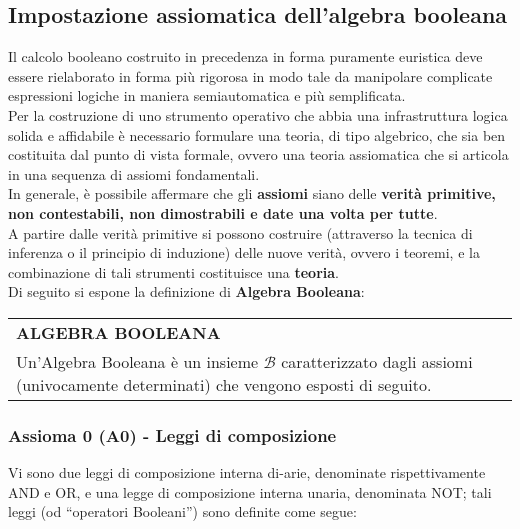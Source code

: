 \documentclass[a4paper]{extarticle}
\newcommand{\quotes}[1]{``#1''}
\renewcommand\arraystretch{}
\begin{document}
\subsection{Impostazione assiomatica dell'algebra booleana}
Il calcolo booleano costruito in precedenza in forma puramente euristica deve essere rielaborato in forma più rigorosa in modo tale da manipolare complicate espressioni logiche in maniera semiautomatica e più semplificata.\\
Per la costruzione di uno strumento operativo che abbia una infrastruttura logica solida e affidabile è necessario formulare una teoria, di tipo algebrico, che sia ben costituita dal punto di vista formale, ovvero una teoria assiomatica che si articola in una sequenza di assiomi fondamentali.\\
In generale, è possibile affermare che gli \textbf{assiomi} siano delle \textbf{verità primitive, non contestabili, non dimostrabili e date una volta per tutte}.\\
A partire dalle verità primitive si possono costruire (attraverso la tecnica di inferenza o il principio di induzione) delle nuove verità, ovvero i teoremi, e la combinazione di tali strumenti costituisce una \textbf{teoria}.\\
Di seguito si espone la definizione di \textbf{Algebra Booleana}:

\vspace{1em}
\setlength{\tabcolsep}{14pt}
\renewcommand{\arraystretch}{2}
\noindent
\begin{tabularx}{\textwidth}{@{}|P|@{}}
    \hline
    {\textbf{ALGEBRA BOOLEANA}}\\
    \parbox{\linewidth}{Un'Algebra Booleana è un insieme \(\mathcal{B}\) caratterizzato dagli assiomi (univocamente determinati) che vengono esposti di seguito.
    \vspace{3mm}}\\
    \hline
\end{tabularx}

\subsubsection{Assioma 0 (A0) - Leggi di composizione}
Vi sono due leggi di composizione interna di-arie, denominate rispettivamente AND e OR, e una legge di composizione interna unaria, denominata NOT; tali leggi (od \quotes{operatori Booleani}) sono definite come segue:
\end{document}
